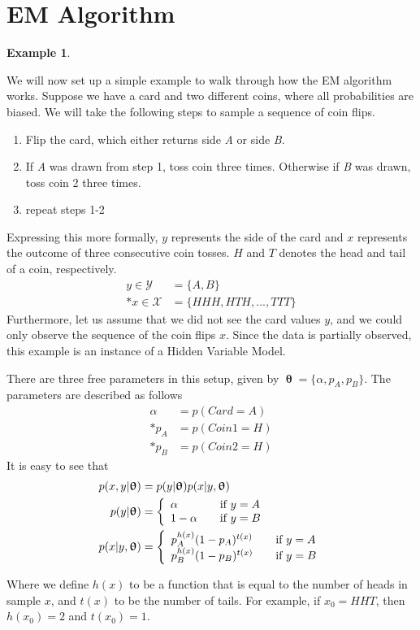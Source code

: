 \documentclass[justified, marginals=justified]{tufte-handout}
\theoremstyle{definition}
\newtheorem{exmp}{Example}
\begin{document}
\section{EM Algorithm}\label{sec:em-algorithm}
\begin{exmp}\label{em-example}

We will now set up a simple example to walk through how the EM algorithm works. Suppose we have a card and two different coins, where all probabilities are biased. We will take the following steps to sample a sequence of coin flips.
\begin{enumerate}
	\item Flip the card, which either returns side \textit{A} or side \textit{B}.
	\item If \textit{A} was drawn from step 1, toss coin  three times. Otherwise if \textit{B} was drawn, toss coin 2 three times. 
	\item repeat steps 1-2
\end{enumerate}

Expressing this more formally, $y$ represents the side of the card and $x$ represents the outcome of three consecutive coin tosses. $H$ and $T$ denotes the head and tail of a coin, respectively. 
\begin{align*}
y \in \mathcal{Y} &= \{A, B\} \\*
x \in \mathcal{X} &= \{HHH, HTH, ..., TTT\}
\end{align*}
\indent Furthermore, let us assume that we did not see the card values $y$, and we could only observe the sequence of the coin flips $x$. Since the data is partially observed, this example is an instance of a Hidden Variable Model.

There are three free parameters in this setup, given by $\bm\uptheta = \{\alpha, p_A, p_B \}$. The parameters are described as follows
\begin{align*}
\alpha &= p(Card = A) \\*
p_A &= p(Coin 1 = H) \\*
p_B &= p(Coin 2 = H) 
\end{align*}
It is easy to see that
\begin{align*}
p(x,y|\bm\uptheta) &= p(y|\bm\uptheta)p(x|y,\bm\uptheta) \\*
p(y|\bm\uptheta) &= \left\{ 
	\begin{array}{l l}
		\alpha & \quad \text{if $y = A$}\\
		1-\alpha & \quad \text{if $y = B	$}
	\end{array} \right.\\*
p(x|y,\bm\uptheta) &= \left\{ 
	\begin{array}{l l}
		p_A^{h(x)}(1-p_A)^{t(x)} & \quad \text{if $y = A$}\\
		p_B^{h(x)}(1-p_B)^{t(x)} & \quad \text{if $y = B	$}
	\end{array} \right.
\end{align*}

Where we define $h(x)$ to be a function that is equal to the number of heads in sample $x$, and $t(x)$ to be the number of tails. For example, if $x_0 = {HHT}$, then $h(x_0) = 2$ and $t(x_0) = 1$.  

\end{exmp}
\end{document}
